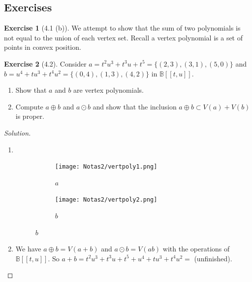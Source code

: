 \documentclass{article}
\theoremstyle{definition}
\newtheorem*{exer*}{Exercise}
\begin{document}
\subsection{Exercises}
\begin{exer*}[4.1 (b)]
    We attempt to show that the sum of two polynomials is not equal to the union of each vertex set. Recall a vertex polynomial is a set of points in convex position.
\end{exer*}
\begin{exer*}[4.2]
    Consider $a=t^2u^3+t^3u+t^5=\{(2,3),(3,1),(5,0)\}$ and $b=u^4+tu^3+t^4u^2=\{(0,4),(1,3),(4,2)\}$ in $\mathbb B [\![t,u]\!]$.
    \begin{enumerate}[label=(\arabic*)]
        \item Show that $a$ and $b$ are vertex polynomials.
        \item Compute $a\oplus b$ and $a\odot b$ and show that the inclusion $a\oplus b\subset V(a)+V(b)$ is proper.
    \end{enumerate}
    \begin{proof}[Solution]
        \begin{enumerate}[label=(\arabic*)]
            \item \leavevmode\\
            \begin{figure}[H]
            \begin{subfigure}{0.5\textwidth}
                \centering
                \texttt{[image: Notas2/vertpoly1.png]}
                \caption*{$a$}
            \end{subfigure}
            \begin{subfigure}{0.5\textwidth}
                \centering
                \texttt{[image: Notas2/vertpoly2.png]}
                \caption*{$b$}
            \end{subfigure}
            \end{figure}
    \item We have $a\oplus b=V(a+b)$ and $a\odot b=V(ab)$ with the operations of $\mathbb B[\![t,u]\!]$. So $a+b=t^2u^3+t^3u+t^5+u^4+tu^3+t^4u^2=$ (unfinished).
\end{enumerate}
\end{proof}
\end{exer*}
\newpage
\end{document}
